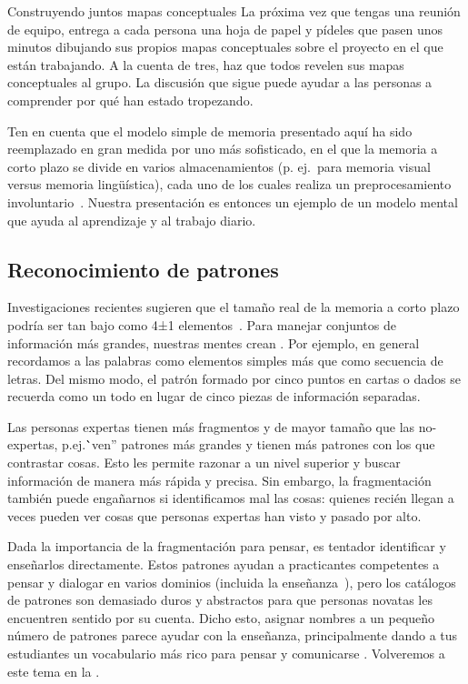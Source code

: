 
\begin{aside}{Construyendo juntos mapas conceptuales}
 La próxima vez que tengas una reunión de equipo,
 entrega a cada persona una hoja de papel
 y pídeles que pasen unos minutos dibujando sus propios mapas conceptuales sobre el proyecto en el que están trabajando.
  A la cuenta de tres,
  haz que todos revelen sus mapas conceptuales al grupo.
  La discusión que sigue puede ayudar a las personas a comprender
  por qué han estado tropezando.
\end{aside}

Ten en cuenta que el modelo simple de memoria presentado aquí ha sido reemplazado en gran medida por uno más sofisticado,
en el que la memoria a corto plazo se divide en varios almacenamientos
(p. ej.\ para memoria visual versus memoria lingüística),
cada uno de los cuales realiza un pre\-procesamiento involuntario~\cite{Mill2016a}.
Nuestra presentación es entonces un ejemplo de un modelo mental que ayuda al aprendizaje y al trabajo diario.

\subsection*{Reconocimiento de patrones}

Investigaciones recientes sugieren que el tamaño real de la memoria a corto plazo 
podría ser tan bajo como 4±1 elementos~\cite{Dida2016}.
Para manejar conjuntos de información más grandes,
nuestras mentes crean .
Por ejemplo,
en general recordamos a las palabras como elementos simples más que como secuencia de letras.
Del mismo modo,
el patrón formado por cinco puntos en cartas o dados se recuerda como un todo 
en lugar de cinco piezas de información separadas.

Las personas expertas tienen más fragmentos y de mayor tamaño que las no-expertas,
p.ej.\``ven'' patrones más grandes y tienen más patrones con los que contrastar cosas.
Esto les permite razonar a un nivel superior
y buscar información de manera más rápida y precisa.
Sin embargo,
la fragmentación también puede engañarnos si identificamos mal las cosas:
quienes recién llegan a veces pueden ver cosas que personas expertas han visto y pasado por alto.

Dada la importancia de la fragmentación para pensar,
es tentador identificar 
y enseñarlos directamente. 
Estos patrones ayudan a practicantes competentes a pensar y dialogar en varios dominios (incluida la enseñanza~\cite{Berg2012}),
pero los catálogos de patrones son demasiado duros y abstractos para que personas novatas les encuentren sentido por su cuenta.
Dicho esto,
asignar nombres a un pequeño número de patrones parece ayudar con la enseñanza,
principalmente dando a tus estudiantes un vocabulario más rico para pensar y comunicarse \cite{Kuit2004,Byck2005,Saja2006}.
Volveremos a este tema en la .


